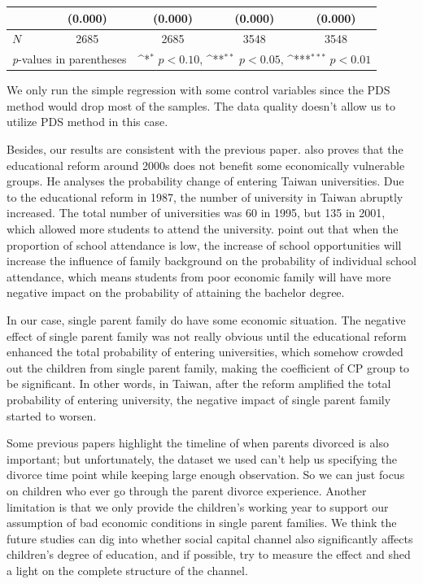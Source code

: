 \documentclass[]{AEA}
\def\sym#1{\ifmmode^{#1}\else\(^{#1}\)\fi}
\begin{document}
\begin{center}
\begin{table}
\begin{tabular}{l*{4}c}
                &     (0.000)         &     (0.000)         &     (0.000)         &     (0.000)         \\
    \hline
    \(N\)       &        2685         &        2685         &        3548         &        3548         \\
    \hline\hline
    \multicolumn{2}{l}{\footnotesize \textit{p}-values in parentheses} & \multicolumn{3}{r}{\footnotesize \sym{*} \(p<0.10\), \sym{**} \(p<0.05\), \sym{***} \(p<0.01\)}\\
    \end{tabular}
    \begin{tablenotes}
        We only run the simple regression with some control variables since the PDS method would drop most of the samples. The data quality doesn't allow us to utilize PDS method in this case.
    \end{tablenotes}
    \end{table}
    \end{center}

    Besides, our results are consistent with the previous paper. \cite{Luoh2004} also proves that the educational reform around 2000s does not benefit some economically vulnerable groups. He analyses the probability change of entering Taiwan universities. Due to the educational reform in 1987, the number of university in Taiwan abruptly increased. The total number of universities was 60 in 1995, but 135 in 2001, which allowed more students to attend the university. \cite{Luoh2004} point out that when the proportion of school attendance is low, the increase of school opportunities will increase the influence of family background on the probability of individual school attendance, which means students from poor economic family will have more negative impact on the probability of attaining the bachelor degree. 
   
    In our case, single parent family do have some economic situation. The negative effect of single parent family was not really obvious until the educational reform enhanced the total probability of entering universities, which somehow crowded out the children from single parent family, making the coefficient of CP group to be significant. In other words, in Taiwan, after the reform amplified the total probability of entering university, the negative impact of single parent family started to worsen.

    Some previous papers highlight the timeline of when parents divorced is also important; but unfortunately, the dataset we used can't help us specifying the divorce time point while keeping large enough observation. So we can just focus on children who ever go through the parent divorce experience.  Another limitation is that we only provide the children's working year to support our assumption of bad economic conditions in single parent families.  We think the future studies can dig into whether social capital channel also significantly affects children's degree of education, and if possible, try to measure the effect and shed a light on the complete structure of the channel.





\end{document}
